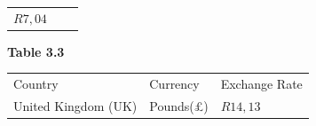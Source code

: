\begin{enumerate}[noitemsep, label=\textbf{\arabic*}. ]
{{\begin{center}
\begin{tabular}[t]{|l|l|l|}
        $R7,04$%
     \tabularnewline\cline{1-1}\cline{2-2}\cline{3-3}
    \end{tabular}
      \end{center}
    \begin{center}{\small\bfseries Table 3.3}\end{center}
          }{ %
        \begin{center}
      \label{m39335*id68755}
    \noindent
      \tablelasttail{}
      \begin{xtabular}[t]{|l|l|l|}\hline
        Country &
        Currency &
        Exchange Rate%
     \tabularnewline{}
        United Kingdom (UK) &
        Pounds(£) &
        $R14,13$%
     \tabularnewline{}

\end{xtabular}
\end{center}}}
\end{enumerate}
